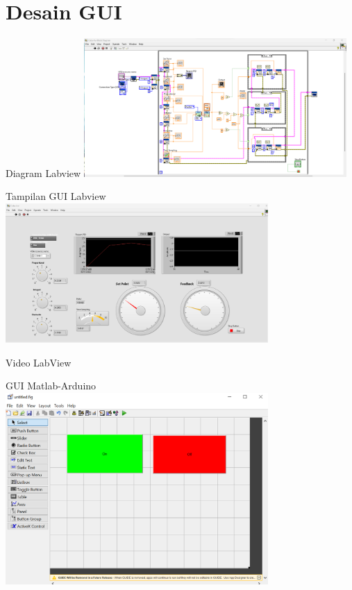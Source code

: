 \documentclass[10pt,xcolor={dvipsnames}]{beamer}
\begin{document}
\section{Desain GUI}

\begin{frame}{Diagram Labview}
	\centering
	\includegraphics[width=10cm]{Gambar Lain/labview1.png}
\end{frame}

\begin{frame}{Tampilan GUI Labview}
	\centering
	\includegraphics[width=10cm]{Gambar Lain/labview2.png}
\end{frame}

\begin{frame}{Video LabView}
	\centering
\end{frame}

\begin{frame}{GUI Matlab-Arduino}
	\centering
	\includegraphics[width=10cm]{Hasil Matlab/GUI MAtlab 1.png}
\end{frame}
\end{document}

